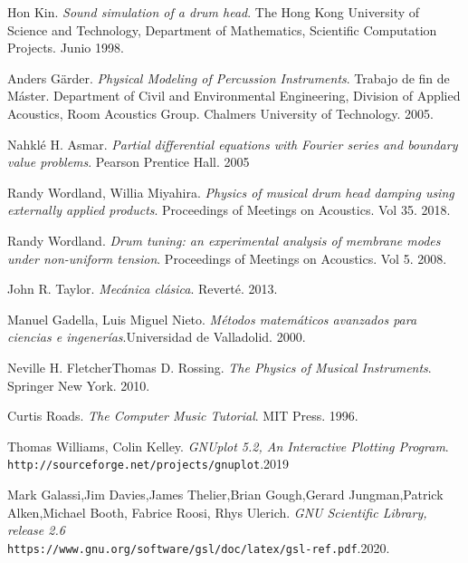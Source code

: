 \documentclass[journal, a4paper,onecolumn]{IEEEtran}
\begin{document}
\begin{thebibliography}{15}


 Hon Kin. \textit{Sound simulation of a drum head}. The Hong Kong University of Science and Technology,
Department of Mathematics,
Scientific Computation Projects. Junio 1998.
\newline

 Anders G{\"a}rder. \textit{Physical Modeling of Percussion Instruments}. Trabajo de fin de Máster. Department of Civil and Environmental Engineering,
Division of Applied Acoustics,
Room Acoustics Group. Chalmers University of Technology. 2005.
\newline

 Nahklé H. Asmar. \textit{Partial differential equations with Fourier series and boundary value problems}. Pearson Prentice Hall. 2005
\newline

 Randy Wordland, Willia Miyahira. \textit{Physics of musical drum head damping using externally applied products}. Proceedings of Meetings on Acoustics. Vol 35. 2018.
\newline

 Randy Wordland. \textit{Drum tuning: an experimental analysis of membrane modes under non-uniform tension}.
Proceedings of Meetings on Acoustics. Vol 5. 2008.
\newline

 John R. Taylor. \textit{Mecánica clásica}. Reverté. 2013.
\newline

 Manuel Gadella, Luis Miguel Nieto. \textit{Métodos matemáticos avanzados para ciencias e ingenerías}.Universidad de Valladolid. 2000.
\newline

 Neville H. FletcherThomas D. Rossing. \textit{The Physics of Musical Instruments}. Springer New York. 2010.
\newline

 Curtis Roads. \textit{The Computer Music Tutorial}. MIT Press. 1996.
\newline

 Thomas Williams, Colin Kelley. \textit{GNUplot 5.2, An Interactive Plotting Program}.\\\texttt{http://sourceforge.net/projects/gnuplot}.2019
\newline

 Mark Galassi,Jim Davies,James Thelier,Brian Gough,Gerard Jungman,Patrick Alken,Michael Booth, Fabrice Roosi, Rhys Ulerich. \textit{GNU Scientific Library, release 2.6} \\\texttt{https://www.gnu.org/software/gsl/doc/latex/gsl-ref.pdf}.2020.
\newline









\end{thebibliography}
\end{document}
